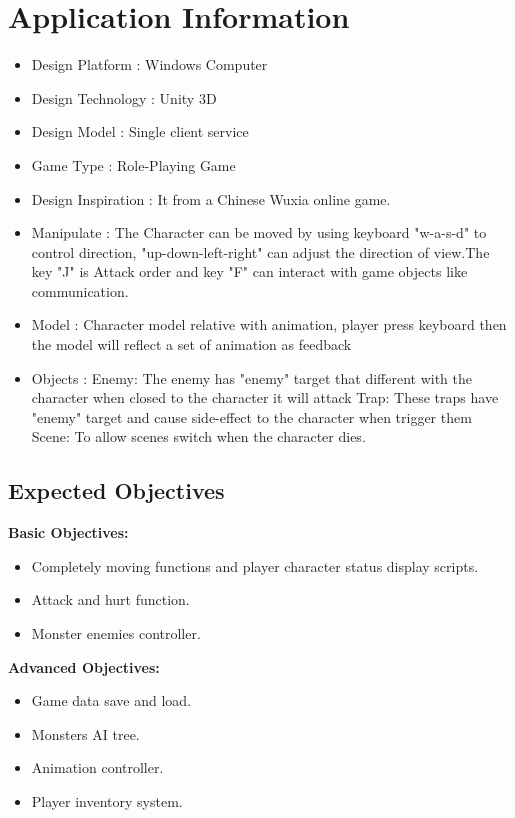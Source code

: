 \section{Application Information}
\begin{itemize}
\item Design Platform
:
Windows Computer
\\
\item Design Technology
:
Unity 3D
\\
\item Design Model
:
Single client service
\\
\item Game Type
:
Role-Playing Game
\\
\item Design Inspiration
:
It from a Chinese Wuxia online game.
\\
\item Manipulate
:
The Character can be moved by using keyboard "w-a-s-d" to control direction, "up-down-left-right" can adjust the direction of view.The key "J" is Attack order and key "F" can interact with game objects like communication.
\\
\item Model
:
Character model relative with animation, player press keyboard then the model will reflect a set of animation as feedback
\\
\item Objects
:
Enemy: The enemy has "enemy" target that different with the character when closed to the character it will attack Trap: These traps have "enemy" target and cause side-effect to the character when trigger them Scene: To allow scenes switch when the character dies. 

\end{itemize}

\subsection{Expected Objectives}
{\textbf{Basic Objectives:}}

\begin{itemize}
\item Completely moving functions and player character status display scripts.

\item Attack and hurt function.

\item Monster enemies controller.
\end{itemize}
{\textbf{Advanced Objectives:}}
\begin{itemize}
\item Game data save and load.

\item Monsters AI tree.

\item Animation controller.

\item Player inventory system.
\end{itemize}


